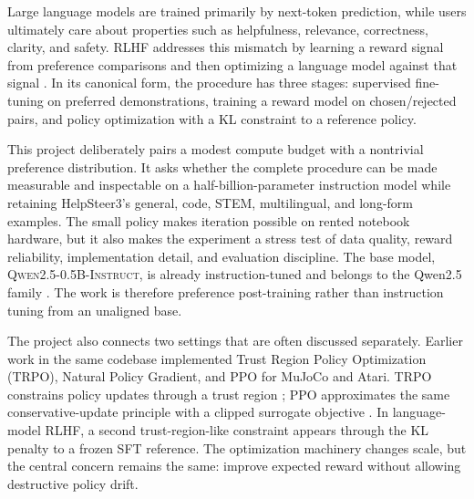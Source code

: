 \documentclass[11pt]{article}
\newcommand{\model}{\textsc{Qwen2.5-0.5B-Instruct}}
\begin{document}
Large language models are trained primarily by next-token prediction, while
users ultimately care about properties such as helpfulness, relevance,
correctness, clarity, and safety. RLHF addresses this mismatch by learning a
reward signal from preference comparisons and then optimizing a language model
against that signal \cite{christiano2017,stiennon2020,ouyang2022}. In its
canonical form, the procedure has three stages: supervised fine-tuning on
preferred demonstrations, training a reward model on chosen/rejected pairs,
and policy optimization with a KL constraint to a reference policy.


This project deliberately pairs a modest compute budget with a nontrivial
preference distribution. It asks whether the complete procedure can be made
measurable and inspectable on a half-billion-parameter instruction model while
retaining HelpSteer3's general, code, STEM, multilingual, and long-form
examples. The small policy makes iteration possible on rented notebook
hardware, but it also makes the experiment a stress test of data quality,
reward reliability, implementation detail, and evaluation discipline. The
base model, \model{}, is already instruction-tuned and belongs to the Qwen2.5
family \cite{qwen25}. The work is therefore preference post-training rather
than instruction tuning from an unaligned base.

The project also connects two settings that are often discussed separately.
Earlier work in the same codebase implemented Trust Region Policy Optimization
(TRPO), Natural Policy Gradient, and PPO for MuJoCo and Atari. TRPO constrains
policy updates through a trust region \cite{schulman2015}; PPO approximates the
same conservative-update principle with a clipped surrogate objective
\cite{schulman2017}. In language-model RLHF, a second trust-region-like
constraint appears through the KL penalty to a frozen SFT reference. The
optimization machinery changes scale, but the central concern remains the
same: improve expected reward without allowing destructive policy drift.
\end{document}
